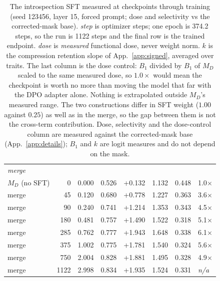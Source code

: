 \begin{table}[t]
\begin{tabular}{lrrrrrrl}
\midrule
\multicolumn{8}{l}{\emph{merge}} \\
$M_D$ (no SFT) & 0 & 0.000 & 0.526 & +0.132 & 1.132 & 0.448 & 1.0$\times$ \\
merge & 45 & 0.120 & 0.680 & +0.778 & 1.227 & 0.363 & 3.6$\times$ \\
merge & 90 & 0.240 & 0.741 & +1.214 & 1.353 & 0.343 & 4.5$\times$ \\
merge & 180 & 0.481 & 0.757 & +1.490 & 1.522 & 0.318 & 5.1$\times$ \\
merge & 285 & 0.762 & 0.777 & +1.943 & 1.648 & 0.338 & 6.1$\times$ \\
merge & 375 & 1.002 & 0.775 & +1.781 & 1.540 & 0.324 & 5.6$\times$ \\
merge & 750 & 2.004 & 0.828 & +1.881 & 1.495 & 0.328 & 4.9$\times$ \\
merge & 1122 & 2.998 & 0.834 & +1.935 & 1.524 & 0.331 & \textit{n/a} \\
\bottomrule
\end{tabular}
\caption{The introspection SFT measured at checkpoints through training (seed 123456, layer 15, forced prompt; dose and selectivity vs the corrected-mask base). \emph{step} is optimizer steps; one epoch is 374.2 steps, so the run is 1122 steps and the final row is the trained endpoint. \emph{dose} is \emph{measured} functional dose, never weight norm. $k$ is the compression retention slope of App.~\ref{app:signed}, averaged over traits. The last column is the dose control: $B_1$ divided by $B_1$ of $M_D$ scaled to the same measured dose, so $1.0\times$ would mean the checkpoint is worth no more than moving the model that far with the DPO adapter alone. Nothing is extrapolated outside $M_D$'s measured range. The two constructions differ in SFT weight ($1.00$ against $0.25$) as well as in the merge, so the gap between them is not the cross-term contribution. Dose, selectivity and the dose-control column are measured against the corrected-mask base (App.~\ref{app:details}); $B_1$ and $k$ are logit measures and do not depend on the mask.}
\label{tab:oct-sft-curve}
\end{table}

